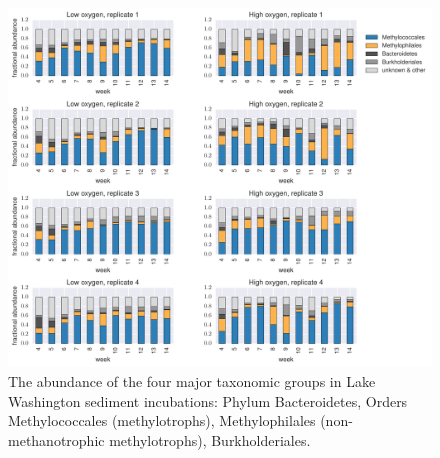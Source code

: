 \begin{figure}[H]
\centering
    \includegraphics[width=1.0\textwidth]{./tex/chapter2/figures/170413_4_main_groups.pdf}  %
    \begin{singlespace}
    \caption[Four major taxonomic groups in Lake Washington sediment incubations]{
        The abundance of the four major taxonomic groups in Lake Washington sediment incubations:
	Phylum Bacteroidetes, Orders Methylococcales (methylotrophs), Methylophilales (non-methanotrophic methylotrophs), Burkholderiales.}
    \label{fig:dominant_genera}
    \end{singlespace}
\end{figure}

